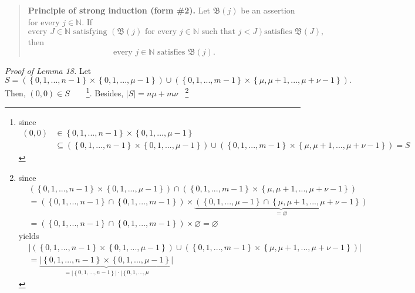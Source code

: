 \documentclass[12pt,final,notitlepage,onecolumn]{article}%
\begin{document}
\begin{quote}
\textbf{Principle of strong induction (form \#2).} Let $\mathfrak{B}\left(
j\right)  $ be an assertion for every $j\in\mathbb{N}$. If%
\[
\text{every }J\in\mathbb{N}\text{ satisfying }\left(  \mathfrak{B}\left(
j\right)  \text{ for every }j\in\mathbb{N}\text{ such that }j<J\right)  \text{
satisfies }\mathfrak{B}\left(  J\right)  ,
\]
then%
\[
\text{every }j\in\mathbb{N}\text{ satisfies }\mathfrak{B}\left(  j\right)
\text{.}%
\]

\end{quote}

\textit{Proof of Lemma 18.} Let%
\[
S=\left(  \left\{  0,1,...,n-1\right\}  \times\left\{  0,1,...,\mu-1\right\}
\right)  \cup\left(  \left\{  0,1,...,m-1\right\}  \times\left\{  \mu
,\mu+1,...,\mu+\nu-1\right\}  \right)  .
\]
Then, $\left(  0,0\right)  \in S$\ \ \ \ \footnote{since
\begin{align*}
\left(  0,0\right)   &  \in\left\{  0,1,...,n-1\right\}  \times\left\{
0,1,...,\mu-1\right\} \\
&  \subseteq\left(  \left\{  0,1,...,n-1\right\}  \times\left\{
0,1,...,\mu-1\right\}  \right)  \cup\left(  \left\{  0,1,...,m-1\right\}
\times\left\{  \mu,\mu+1,...,\mu+\nu-1\right\}  \right)  =S
\end{align*}
}. Besides, $\left\vert S\right\vert =n\mu+m\nu\ \ \ \ $\footnote{since%
\begin{align*}
&  \left(  \left\{  0,1,...,n-1\right\}  \times\left\{  0,1,...,\mu-1\right\}
\right)  \cap\left(  \left\{  0,1,...,m-1\right\}  \times\left\{  \mu
,\mu+1,...,\mu+\nu-1\right\}  \right) \\
&  =\left(  \left\{  0,1,...,n-1\right\}  \cap\left\{  0,1,...,m-1\right\}
\right)  \times\underbrace{\left(  \left\{  0,1,...,\mu-1\right\}
\cap\left\{  \mu,\mu+1,...,\mu+\nu-1\right\}  \right)  }_{=\varnothing}\\
&  =\left(  \left\{  0,1,...,n-1\right\}  \cap\left\{  0,1,...,m-1\right\}
\right)  \times\varnothing=\varnothing
\end{align*}
yields%
\begin{align*}
&  \left\vert \left(  \left\{  0,1,...,n-1\right\}  \times\left\{
0,1,...,\mu-1\right\}  \right)  \cup\left(  \left\{  0,1,...,m-1\right\}
\times\left\{  \mu,\mu+1,...,\mu+\nu-1\right\}  \right)  \right\vert \\
&  =\underbrace{\left\vert \left\{  0,1,...,n-1\right\}  \times\left\{
0,1,...,\mu-1\right\}  \right\vert }_{=\left\vert \left\{
0,1,...,n-1\right\}  \right\vert \cdot\left\vert \left\{  0,1,...,\mu
}
\end{align*}}
\end{document}
